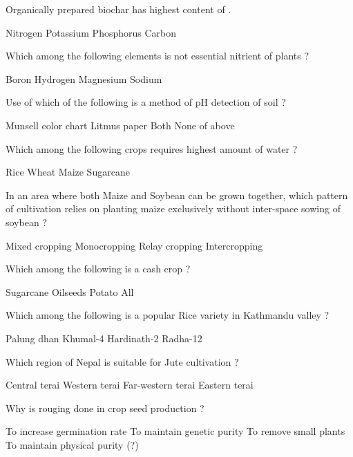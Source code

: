 \begin{questions}
\question Organically prepared biochar has highest content of \fillin[][3cm].
\begin{choices}
\choice Nitrogen
\choice Potassium
\choice Phosphorus
\CorrectChoice Carbon
\end{choices}

\question Which among the following elements is not essential nitrient of plants ?
\begin{choices}
\choice Boron
\choice Hydrogen
\choice Magnesium
\CorrectChoice Sodium
\end{choices}

\question Use of which of the following is a method of pH detection of soil ?
\begin{choices}
\choice Munsell color chart
\CorrectChoice Litmus paper
\choice Both
\choice None of above
\end{choices}

\question Which among the following crops requires highest amount of water ?
\begin{choices}
\choice Rice
\choice Wheat
\choice Maize
\CorrectChoice Sugarcane
\end{choices}

\question In an area where both Maize and Soybean can be grown together, which pattern of cultivation relies on planting maize exclusively without inter-space sowing of soybean ?
\begin{choices}
\choice Mixed cropping
\CorrectChoice Monocropping
\choice Relay cropping
\choice Intercropping
\end{choices}

\question Which among the following is a cash crop ?
\begin{choices}
\choice Sugarcane
\choice Oilseeds
\choice Potato
\CorrectChoice All
\end{choices}

\question Which among the following is a popular Rice variety in Kathmandu valley ?
\begin{choices}
\choice Palung dhan
\CorrectChoice Khumal-4
\choice Hardinath-2
\choice Radha-12
\end{choices}

\question Which region of Nepal is suitable for Jute cultivation ?
\begin{choices}
\choice Central terai
\choice Western terai
\choice Far-western terai
\CorrectChoice Eastern terai
\end{choices}

\question Why is rouging done in crop seed production ?
\begin{choices}
\choice To increase germination rate
\choice To maintain genetic purity
\choice To remove small plants
\CorrectChoice To maintain physical purity (?)
\end{choices}


\end{questions}

